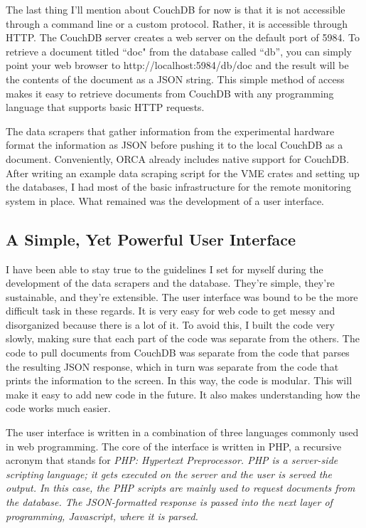 			The last thing I'll mention about CouchDB for now is that it is not accessible through a command line or a custom protocol. Rather, it is accessible through HTTP. The CouchDB server creates a web server on the default port of 5984. To retrieve a document titled ``doc" from the database called ``db'', you can simply point your web browser to http://localhost:5984/db/doc and the result will be the contents of the document as a JSON string. This simple method of access makes it easy to retrieve documents from CouchDB with any programming language that supports basic HTTP requests. 

			The data scrapers that gather information from the experimental hardware format the information as JSON before pushing it to the local CouchDB as a document. Conveniently, ORCA already includes native support for CouchDB. After writing an example data scraping script for the VME crates and setting up the databases, I had most of the basic infrastructure for the remote monitoring system in place. What remained was the development of a user interface.

		
		\subsection{A Simple, Yet Powerful User Interface}
			I have been able to stay true to the guidelines I set for myself during the development of the data scrapers and the database. They're simple, they're sustainable, and they're extensible. The user interface was bound to be the more difficult task in these regards. It is very easy for web code to get messy and disorganized because there is a lot of it. To avoid this, I built the code very slowly, making sure that each part of the code was separate from the others. The code to pull documents from CouchDB was separate from the code that parses the resulting JSON response, which in turn was separate from the code that prints the information to the screen. In this way, the code is modular. This will make it easy to add new code in the future. It also makes understanding how the code works much easier.

			The user interface is written in a combination of three languages commonly used in web programming. The core of the interface is written in PHP, a recursive acronym that stands for \it PHP: Hypertext Preprocessor\rm. PHP is a server-side scripting language; it gets executed on the server and the user is served the output. In this case, the PHP scripts are mainly used to request documents from the database. The JSON-formatted response is passed into the next layer of programming, Javascript, where it is parsed.

